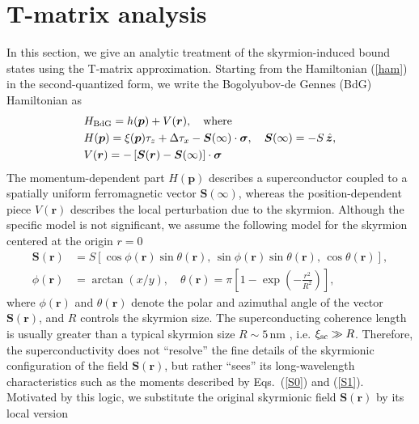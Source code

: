 \documentclass[twocolumn,showpacs,floatfix,nofootinbib,longbibliography]{revtex4-1}
\begin{document}
%



\appendix 

\section{T-matrix analysis} \label{sec:appendixTMatrix}


In this section, we give an analytic treatment of the skyrmion-induced bound states using the T-matrix approximation. Starting from the Hamiltonian (\ref{ham}) in the second-quantized form, we write the Bogolyubov-de Gennes (BdG) Hamiltonian as 
\begin{align}
	& H_{\rm BdG} = h(\bm p) + V(\bm r),\quad {\rm where}  \label{hbdg} \\
& H(\bm p) = \xi(\bm p)\tau_z+\Delta \tau_x - \bm S(\infty)\cdot\bm\sigma,\quad \bm S(\infty) = -S\,\hat{\bm z}, \nonumber\\
& V(\bm r) = -\left[ \bm S(\bm r)-\bm S(\infty)\right]\cdot\bm\sigma \label{v0}
\end{align}
The momentum-dependent part $H(\bm p)$ describes a superconductor coupled to a spatially uniform ferromagnetic vector $\bm S(\infty)$, whereas the position-dependent piece $V(\bm r)$ describes the local perturbation due to the skyrmion. Although the specific model is not significant, we assume the following model for the skyrmion centered at the origin $r=0$
\begin{align}
	\bm S(\bm r) &= S\left[ \cos\phi(\bm r) \sin\theta(\bm r),\, \sin\phi(\bm r)\sin\theta(\bm r),\,\cos\theta(\bm r)\right], \nonumber \\   
	\phi(\bm r) &= \arctan(x/y),\quad \theta(\bm r) = \pi \left[ 1-\exp\left( -\frac{r^2}{R^2} \right) \right], 	\label{sr}
\end{align}
where $\phi(\bm r)$ and $\theta(\bm r)$ denote the polar and azimuthal angle of the vector $\bm S(\bm r)$, and $R$ controls the skyrmion size. The superconducting coherence length is usually greater than a typical skyrmion size $R\sim 5$\,nm \cite{Heinze2011,Romming2013,Bergmann2014,Brede2014,Sonntag2014,vonBergmann2015,Romming2015}, i.e. $\xi_{\rm sc}\gg R$. Therefore, the superconductivity does not ``resolve'' the fine details of the skyrmionic configuration of the field  $\bm S(\bm r)$, but rather ``sees'' its long-wavelength characteristics such as the moments described by Eqs.~(\ref{S0}) and (\ref{S1}). Motivated by this logic, we substitute the original skyrmionic field $\bm S(\bm r)$ by its local version 
\end{document}

